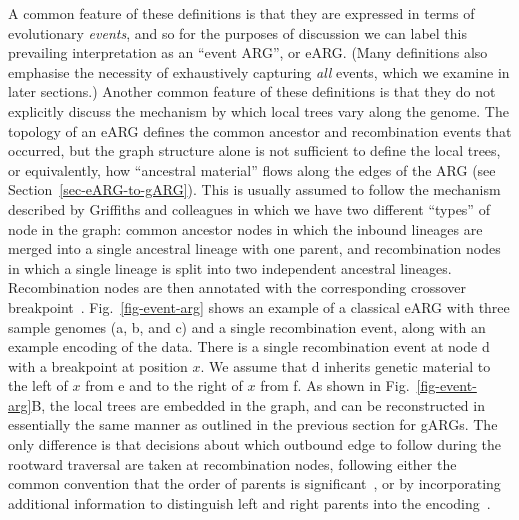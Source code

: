 \documentclass{article}
\newcommand{\noderef}[1]{\textsf{#1}}
\begin{document}
A common feature of these definitions is that they are expressed
in terms of evolutionary \emph{events}, and so for the purposes of
discussion we can label
this prevailing interpretation as an ``event ARG'', or eARG.
(Many definitions also emphasise
the necessity of exhaustively capturing \emph{all} events, which we
examine in later sections.)
Another common feature of these definitions is that they do not explicitly
discuss the mechanism by which local trees vary along the genome.
The topology of an eARG defines the common ancestor and
recombination events that occurred,
but the graph structure alone is not sufficient to define the local trees,
or equivalently, how ``ancestral material'' flows along
the edges of the ARG (see Section~\ref{sec-eARG-to-gARG}).
This is usually assumed to follow the mechanism described by
Griffiths and colleagues in which we have
two different ``types'' of node in the graph:
common ancestor nodes in which the inbound lineages are merged into a
single ancestral lineage with one parent, and recombination
nodes in which a single lineage is split into two independent
ancestral lineages.
Recombination nodes are then
annotated with
the corresponding crossover breakpoint~\citep{griffiths1996ancestral}.
Fig.~\ref{fig-event-arg} shows an example of a classical
eARG with three sample genomes (\noderef{a}, \noderef{b}, and \noderef{c})
and a single recombination event,
along with an example encoding of the data.
There is a single recombination event
at node \noderef{d} with a breakpoint at position $x$. We
assume that \noderef{d} inherits genetic material to the
left of $x$ from \noderef{e} and to the right of $x$ from \noderef{f}.
As shown in Fig.~\ref{fig-event-arg}B,
the local trees are embedded in the graph, and can be reconstructed
in essentially the same manner as outlined in the previous section for
gARGs. The only difference is that decisions about which outbound
edge to follow during the rootward traversal are taken at recombination
nodes, following
either the common convention that the order of parents
is significant~\citep[e.g.][]{griffiths1991two},
or by incorporating additional information to
distinguish left and right parents
into the
encoding~\citep[e.g.][]{gusfield2014recombinatorics,ignatieva2021kwarg}.
\end{document}
